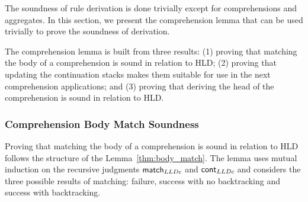 The soundness of rule derivation is done trivially except for comprehensions and aggregates. In this section, we present
the comprehension lemma that can be used trivially to prove the soundness of derivation.

The comprehension lemma is built from three results: (1) proving that matching the body of a comprehension is sound
in relation to HLD;
(2) proving that updating the continuation stacks makes them suitable for use in the next comprehension applications; and
(3) proving that deriving the head of the comprehension is sound in relation to HLD.

\subsubsection{Comprehension Body Match Soundness}

Proving that matching the body of a comprehension is sound in relation to HLD follows the structure of the Lemma~\ref{thm:body_match}. The lemma uses mutual induction on the recursive judgments $\mathsf{match}_{LLDc} \;$and $\mathsf{cont}_{LLDc} \;$and
considers the three possible results of matching: failure, success with no backtracking and success with backtracking.

